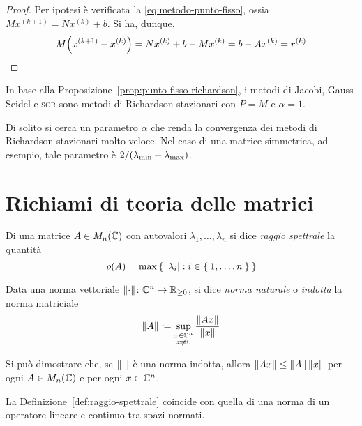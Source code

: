 	\begin{proof}
		Per ipotesi è verificata la \eqref{eq:metodo-punto-fisso}, ossia \(M x^{(k + 1)} = N x^{(k)} + b\). Si ha, dunque,
		\begin{equation*}
			M \qty(x^{(k + 1)} - x^{(k)}) = N x^{(k)} + b - M x^{(k)} = b - A x^{(k)} = r^{(k)} \qedhere
		\end{equation*}
	\end{proof}

	In base alla Proposizione~\ref{prop:punto-fisso-richardson}, i metodi di Jacobi, Gauss-Seidel e \textsc{sor} sono metodi di Richardson stazionari con \(P = M\) e \(\alpha = 1\).
	
	Di solito si cerca un parametro \(\alpha\) che renda la convergenza dei metodi di Richardson stazionari molto veloce. Nel caso di una matrice simmetrica, ad esempio, tale parametro è \(2 / (\lambda_\textup{min} + \lambda_\textup{max})\).
	
\section{Richiami di teoria delle matrici}
	
	\begin{definizione}\label{def:raggio-spettrale}
		Di una matrice \(A \in M_n (\mathbb{C})\) con autovalori \(\lambda_1, \dots, \lambda_n\) si dice \emph{raggio spettrale} la quantità
		\begin{equation}
			\operatorname{\varrho} (A) = \max \Set{\abs{\lambda_i} : i \in \Set{1, \dots, n}}
		\end{equation}
	\end{definizione}

	\begin{definizione}\label{def:norma-indotta}
		Data una norma vettoriale \(\norm{\cdot} \colon \mathbb{C}^n \to \mathbb{R}_{\ge 0}\), si dice \emph{norma naturale} o \emph{indotta} la norma matriciale
		\begin{equation}
			\norm{A} \coloneqq \sup_{\substack{x \in \mathbb{C}^n \\ x \ne 0}} \frac{\norm{A x}}{\norm{x}}
		\end{equation}
	\end{definizione}
	
	Si può dimostrare che, se \(\norm{\cdot}\) è una norma indotta, allora \(\norm{A x} \le \norm{A} \, \norm{x}\) per ogni \(A \in M_n (\mathbb{C})\) e per ogni \(x \in \mathbb{C}^n\).
	
	La Definizione~\ref{def:raggio-spettrale} coincide con quella di una norma di un operatore lineare e continuo tra spazi normati.
	
